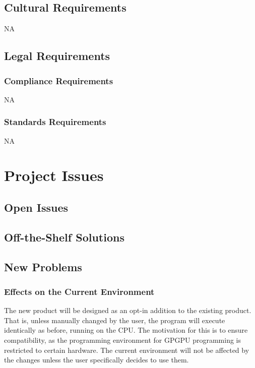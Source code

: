 \documentclass[12pt]{article}
\begin{document}
\subsection{Cultural Requirements} %
NA

\subsection{Legal Requirements} %
\subsubsection{Compliance Requirements}
NA
\subsubsection{Standards Requirements}
NA

\section{Project Issues}

\subsection{Open Issues} %

\subsection{Off-the-Shelf Solutions} %

\subsection{New Problems} %
\subsubsection{Effects on the Current Environment}
The new product will be designed as an opt-in addition to the existing product. That is, unless manually changed by the user, the program will execute identically as before, running on the CPU. The motivation for this is to ensure compatibility, as the programming environment for GPGPU programming is restricted to certain hardware. The current environment will not be affected by the changes unless the user specifically decides to use them.
\end{document}
